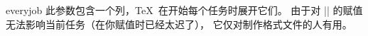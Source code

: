 \begindesc
\cts everyjob {}
\explain
此参数包含一个列，\TeX\ 在开始每个任务时展开它们。
由于对 |\everyjob| 的赋值无法影响当前任务（在你赋值时已经太迟了），
它仅对制作格式文件的人有用。
\enddesc


\enddescriptions \endchapter \byebye
